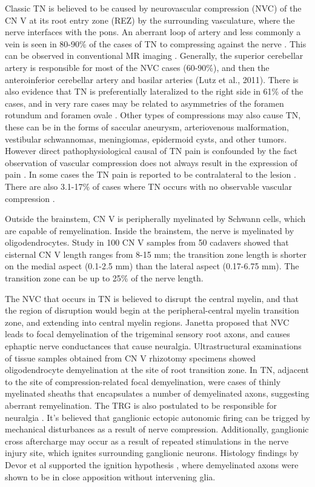 Classic TN is believed to be caused by neurovascular compression (NVC) of the CN V at its root entry zone (REZ) by the surrounding vasculature, where the nerve interfaces with the pons. An aberrant loop of artery and less commonly a vein is seen in 80-90\% of the cases of TN to compressing against the nerve \cite{Love2001,McLaughlin1999}. This can be observed in conventional MR imaging \cite{Borges2010}. Generally, the superior cerebellar artery is responsible for most of the NVC cases (60-90\%), and then the anteroinferior cerebellar artery and basilar arteries (Lutz et al., 2011). There is also evidence that TN is preferentially lateralized to the right side in 61\% of the cases, and in very rare cases may be related to asymmetries of the foramen rotundum and foramen ovale \cite{Toda2009}.  Other types of compressions may also cause TN, these can be in the forms of saccular aneurysm, arteriovenous malformation, vestibular schwannomas, meningiomas, epidermoid cysts, and other tumors.  However direct pathophysiological causal of TN pain is confounded by the fact observation of vascular compression does not always result in the expression of pain \cite{Desouza2013,Hodaie2013}. In some cases the TN pain is reported to be contralateral to the lesion \cite{Cheng2008,Haddad1990,Revuelta1995}. There are also 3.1-17\% of cases where TN occurs with no observable vascular compression \cite{Revuelta-Gutierrez2006}. 

Outside the brainstem, CN V is peripherally myelinated by Schwann cells, which are capable of remyelination. Inside the brainstem, the nerve is myelinated by oligodendrocytes. Study in 100 CN V samples from 50 cadavers \cite{Peker2006} showed that cisternal CN V length ranges from 8-15 mm; the transition zone length is shorter on the medial aspect (0.1-2.5 mm) than the lateral aspect (0.17-6.75 mm). The transition zone can be up to 25\% of the nerve length. 

The NVC that occurs in TN is believed to disrupt the central myelin, and that the region of disruption would begin at the peripheral-central myelin transition zone, and extending into central myelin regions. Janetta \cite{Jannetta1967} proposed that NVC leads to focal demyelination of the trigeminal sensory root axons, and causes ephaptic nerve conductances that cause neuralgia. Ultrastructural examinations \cite{Love1998} of tissue samples obtained from CN V rhizotomy specimens showed oligodendrocyte demyelination at the site of root transition zone. In TN, adjacent to the site of compression-related focal demyelination, were cases of thinly myelinated sheaths that encapsulates a number of demyelinated axons, suggesting aberrant remyelination. The TRG is also postulated to be responsible for neuralgia \cite{Rappaport1994}. It's believed that ganglionic ectopic autonomic firing can be trigged by mechanical disturbances as a result of nerve compression. Additionally, ganglionic cross aftercharge may occur as a result of repeated stimulations in the nerve injury site, which ignites surrounding ganglionic neurons. Histology findings by Devor et al supported the ignition hypothesis \cite{Devor2002a}, where demyelinated axons were shown to be in close apposition without intervening glia. 

